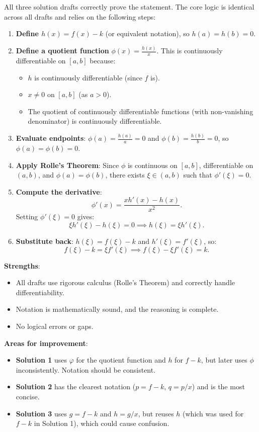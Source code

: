 \documentclass[12pt,a4paper]{article}
\theoremstyle{definition}
\begin{document}
    All three solution drafts correctly prove the statement. The core logic is identical across all drafts and relies on the following steps:
    \begin{enumerate}
        \item \textbf{Define $h(x) = f(x) - k$} (or equivalent notation), so $h(a) = h(b) = 0$.
        \item \textbf{Define a quotient function} $\phi(x) = \frac{h(x)}{x}$. This is continuously differentiable on $[a, b]$ because:
        \begin{itemize}
            \item $h$ is continuously differentiable (since $f$ is).
            \item $x \neq 0$ on $[a, b]$ (as $a > 0$).
            \item The quotient of continuously differentiable functions (with non-vanishing denominator) is continuously differentiable.
        \end{itemize}
        \item \textbf{Evaluate endpoints}: $\phi(a) = \frac{h(a)}{a} = 0$ and $\phi(b) = \frac{h(b)}{b} = 0$, so $\phi(a) = \phi(b) = 0$.
        \item \textbf{Apply Rolle's Theorem}: Since $\phi$ is continuous on $[a, b]$, differentiable on $(a, b)$, and $\phi(a) = \phi(b)$, there exists $\xi \in (a, b)$ such that $\phi'(\xi) = 0$.
        \item \textbf{Compute the derivative}:
        \[
            \phi'(x) = \frac{x h'(x) - h(x)}{x^2}.
        \]
        Setting $\phi'(\xi) = 0$ gives:
        \[
            \xi h'(\xi) - h(\xi) = 0 \implies h(\xi) = \xi h'(\xi).
        \]
        \item \textbf{Substitute back}: $h(\xi) = f(\xi) - k$ and $h'(\xi) = f'(\xi)$, so:
        \[
            f(\xi) - k = \xi f'(\xi) \implies f(\xi) - \xi f'(\xi) = k.
        \]
    \end{enumerate}

    \textbf{Strengths}:
    \begin{itemize}
        \item All drafts use rigorous calculus (Rolle's Theorem) and correctly handle differentiability.
        \item Notation is mathematically sound, and the reasoning is complete.
        \item No logical errors or gaps.
    \end{itemize}

    \textbf{Areas for improvement}:
    \begin{itemize}
        \item \textbf{Solution 1} uses $\varphi$ for the quotient function and $h$ for $f - k$, but later uses $\phi$ inconsistently. Notation should be consistent.
        \item \textbf{Solution 2} has the clearest notation ($p = f - k$, $q = p/x$) and is the most concise.
        \item \textbf{Solution 3} uses $g = f - k$ and $h = g/x$, but reuses $h$ (which was used for $f - k$ in Solution 1), which could cause confusion.
    \end{itemize}
\end{document}
